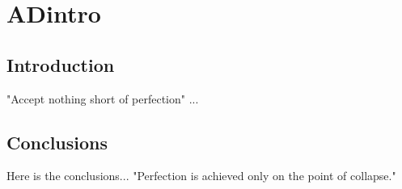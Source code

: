 \chapter{ADintro}
\label{chap:ADintro}

\section{Introduction}

"Accept nothing short of perfection" \cite{IntraneuronalAbetaSynapsePathology}... 

\section{Conclusions}

Here is the conclusions... "Perfection is achieved only on the point of collapse." 


\endinput







